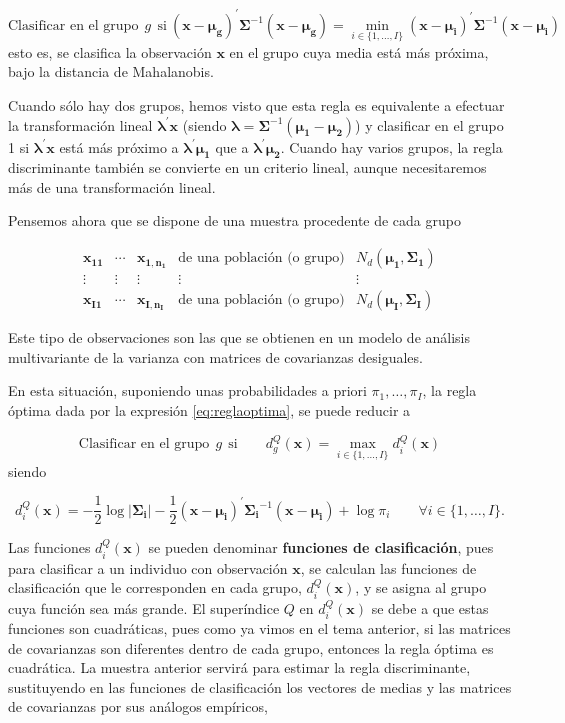 \documentclass[
  a4paper,
  oneside]{scrbook}
\theoremstyle{definition}
\theoremstyle{definition}
\theoremstyle{definition}
\theoremstyle{definition}
\theoremstyle{remark}
\begin{document}
\begin{equation}
\mbox{Clasificar en el grupo}\ \  g \ \ \mbox{si}\ \left(\bm{x}-\bm{\mu_g}\right)^\prime{}\bm{\Sigma}^{-1}\left(\bm{x}-\bm{\mu_g}\right)
=\min_{i\in\{1,\ldots,I\}} \left(\bm{x}-\bm{\mu_i}\right)^\prime{}\bm{\Sigma}^{-1}\left(\bm{x}-\bm{\mu_i}\right)
\label{eq:reglaoptima}
\end{equation}
esto es, se clasifica la observación \(\bm{x}\) en el grupo cuya media
está más próxima, bajo la distancia de Mahalanobis.

Cuando sólo hay dos grupos, hemos visto que esta regla es equivalente a
efectuar la transformación lineal \(\bm{\lambda}^\prime{}\bm{x}\) (siendo
\(\bm{\lambda}=\bm{\Sigma}^{-1}(\bm{\mu_1}-\bm{\mu_2})\)) y clasificar en
el grupo 1 si \(\bm{\lambda}^\prime{}\bm{x}\) está más próximo a
\(\bm{\lambda}^\prime{}\bm{\mu_1}\) que a
\(\bm{\lambda}^\prime{}\bm{\mu_2}\). Cuando hay varios grupos, la regla
discriminante también se convierte en un criterio lineal, aunque
necesitaremos más de una transformación lineal.

Pensemos ahora que se dispone de una muestra procedente de cada grupo

\[\begin{array}{ccccc}
\bm{x_{11}} &  \cdots & \bm{x_{1,n_1}} & \mbox{de una población (o grupo)} & N_d(\bm{\mu_1},\bm{\Sigma_1}) \\
\vdots &  \vdots & \vdots & \vdots & \vdots \\
\bm{x_{I1}}  &  \cdots & \bm{x_{I,n_I}} &\mbox{de una población (o grupo)} & N_d(\bm{\mu_I},\bm{\Sigma_I})
\end{array}\]

Este tipo de observaciones son las que se obtienen en un modelo de
análisis multivariante de la varianza con matrices de covarianzas
desiguales.

En esta situación, suponiendo unas probabilidades a priori
\(\pi_1,\ldots,\pi_I\), la regla óptima dada por la expresión
\eqref{eq:reglaoptima}, se puede reducir a

\[\mbox{Clasificar en el grupo}\ \  g \ \ \mbox{si}\qquad d_g^Q (\bm{x})=\max_{i\in\{1,\ldots,I\}} d_i^Q(\bm{x})\]
siendo

\[d_i^Q(\bm{x})=-\frac{1}{2}\log \left|\bm{\Sigma_i}\right| -\frac{1}{2}\left(\bm{x}-\bm{\mu_i}\right)^\prime{}\bm{\Sigma_i}^{-1}\left(\bm{x}-\bm{\mu_i}\right)
+\log \pi_i\qquad\forall i\in\{1,\ldots,I\}.\]

Las funciones \(d_i^Q(\bm{x})\) se pueden denominar \textbf{funciones de
clasificación}, pues para clasificar a un individuo con observación
\(\bm{x}\), se calculan las funciones de clasificación que le corresponden
en cada grupo, \(d_i^Q(\bm{x})\), y se asigna al grupo cuya función sea
más grande. El superíndice \(Q\) en \(d_i^Q(\bm{x})\) se debe a que estas
funciones son cuadráticas, pues como ya vimos en el tema anterior, si
las matrices de covarianzas son diferentes dentro de cada grupo,
entonces la regla óptima es cuadrática. La muestra anterior servirá para
estimar la regla discriminante, sustituyendo en las funciones de
clasificación los vectores de medias y las matrices de covarianzas por
sus análogos empíricos,
\end{document}
